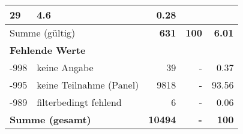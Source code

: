 \begin{longtable}{lXrrr}
       \num{29} &
       \num[round-mode=places,round-precision=2]{4.6} &
         \num[round-mode=places,round-precision=2]{0.28} \\
     \midrule
     \multicolumn{2}{l}{Summe (gültig)} &
       \textbf{\num{631}} &
     \textbf{\num{100}} &
       \textbf{\num[round-mode=places,round-precision=2]{6.01}} \\
     \multicolumn{5}{l}{\textbf{Fehlende Werte}}\\
       -998 &
       keine Angabe &
         \num{39} &
        - &
         \num[round-mode=places,round-precision=2]{0.37} \\
       -995 &
       keine Teilnahme (Panel) &
         \num{9818} &
        - &
         \num[round-mode=places,round-precision=2]{93.56} \\
       -989 &
       filterbedingt fehlend &
         \num{6} &
        - &
         \num[round-mode=places,round-precision=2]{0.06} \\
     \midrule
     \multicolumn{2}{l}{\textbf{Summe (gesamt)}} &
          \textbf{\num{10494}} &
        \textbf{-} &
        \textbf{\num{100}} \\
     \bottomrule
     \end{longtable}
     
